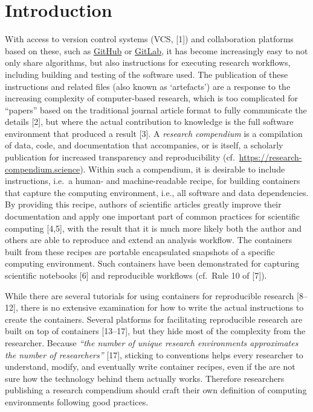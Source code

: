 \documentclass[10pt,letterpaper]{article}
\begin{document}
\linenumbers

\hypertarget{introduction}{%
\section*{Introduction}\label{introduction}}

With access to version control systems (VCS, {[}1{]}) and collaboration
platforms based on these, such as \href{https://github.com}{GitHub} or
\href{https://gitlab.com}{GitLab}, it has become increasingly easy to
not only share algorithms, but also instructions for executing research
workflows, including building and testing of the software used. The
publication of these instructions and related files (also known as
`artefacts') are a response to the increasing complexity of
computer-based research, which is too complicated for ``papers'' based
on the traditional journal article format to fully communicate the
details {[}2{]}, but where the actual contribution to knowledge is the
full software environment that produced a result {[}3{]}. A
\emph{research compendium} is a compilation of data, code, and
documentation that accompanies, or is itself, a scholarly publication
for increased transparency and reproducibility
(cf.~\url{https://research-compendium.science}). Within such a
compendium, it is desirable to include instructions, i.e.~a human- and
machine-readable recipe, for building containers that capture the
computing environment, i.e., all software and data dependencies. By
providing this recipe, authors of scientific articles greatly improve
their documentation and apply one important part of common practices for
scientific computing {[}4,5{]}, with the result that it is much more
likely both the author and others are able to reproduce and extend an
analysis workflow. The containers built from these recipes are portable
encapsulated snapshots of a specific computing environment. Such
containers have been demonstrated for capturing scientific notebooks
{[}6{]} and reproducible workflows (cf.~Rule 10 of {[}7{]}).

While there are several tutorials for using containers for reproducible
research {[}8--12{]}, there is no extensive examination for how to write
the actual instructions to create the containers. Several platforms for
facilitating reproducible research are built on top of containers
{[}13--17{]}, but they hide most of the complexity from the researcher.
Because \emph{``the number of unique research environments approximates
the number of researchers''} {[}17{]}, sticking to conventions helps
every researcher to understand, modify, and eventually write container
recipes, even if the are not sure how the technology behind them
actually works. Therefore researchers publishing a research compendium
should craft their own definition of computing environments following
good practices.
\end{document}

